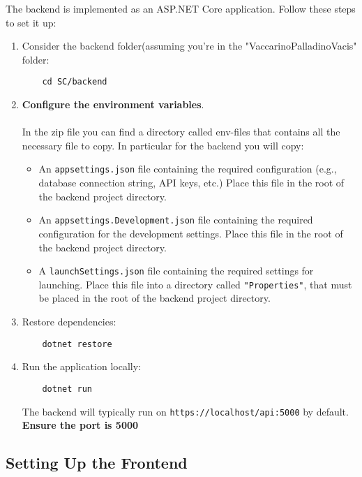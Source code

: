 The backend is implemented as an ASP.NET Core application. Follow these steps to set it up:
\begin{enumerate}
    \item Consider the backend folder(assuming you're in the "VaccarinoPalladinoVacis" folder:
    \begin{verbatim}
    cd SC/backend
    \end{verbatim}

    \item \textbf{Configure the environment variables}.\\\\ In the zip file you can find a directory called env-files that contains all the necessary file to copy. In particular for the backend you will copy:
    \begin{itemize}
        \item An \texttt{appsettings.json} file containing the required configuration (e.g., database connection string, API keys, etc.) Place this file in the root of the backend project directory.
        \item An \texttt{appsettings.Development.json} file containing the required configuration for the development settings. Place this file in the root of the backend project directory.
        \item A \texttt{launchSettings.json} file containing the required settings for launching. Place this file into a directory called \texttt{"Properties"}, that must be placed in the root of the backend project directory.
    \end{itemize}

    \item Restore dependencies:
    \begin{verbatim}
    dotnet restore
    \end{verbatim}

    \item Run the application locally:
    \begin{verbatim}
    dotnet run
    \end{verbatim}
    The backend will typically run on \texttt{https://localhost/api:5000} by default. \textbf{Ensure the port is 5000}
\end{enumerate}

\subsection{Setting Up the Frontend}

